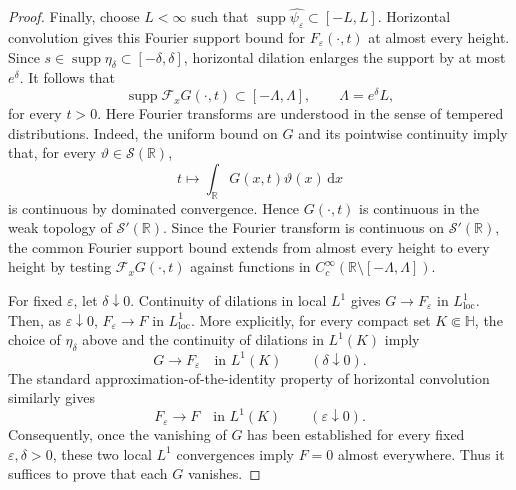 \documentclass[12pt,a4paper]{article}
\theoremstyle{remark}
\newcommand{\dd}{\,\mathrm d}
\begin{document}
\begin{proof}
Finally, choose $L<\infty$ such that
$\operatorname{supp}\widehat{\psi_\varepsilon}\subset[-L,L]$.
Horizontal convolution gives this Fourier support bound for
$F_\varepsilon(\cdot,t)$ at almost every height.
Since $s\in\operatorname{supp}\eta_\delta\subset[-\delta,\delta]$,
horizontal dilation enlarges the support by at most $e^\delta$.
It follows that
\[
\operatorname{supp}\mathcal F_xG(\cdot,t)
\subset[-\Lambda,\Lambda],
\qquad \Lambda=e^\delta L,
\]
for every $t>0$. Here Fourier transforms are understood in
the sense of tempered distributions. Indeed, the uniform bound on $G$ and its pointwise continuity
imply that, for every $\vartheta\in\mathcal S(\mathbb R)$,
\[
t\longmapsto
\int_{\mathbb R}G(x,t)\vartheta(x)\dd x
\]
is continuous by dominated convergence. Hence
$G(\cdot,t)$ is continuous in the weak topology of
$\mathcal S'(\mathbb R)$. Since the Fourier transform is continuous
on $\mathcal S'(\mathbb R)$, the common Fourier support bound
extends from almost every height to every height by testing
$\mathcal F_xG(\cdot,t)$ against functions in
$C_c^\infty(\mathbb R\setminus[-\Lambda,\Lambda])$.

For fixed $\varepsilon$, let $\delta\downarrow0$. Continuity of dilations in local $L^1$ gives
$G\to F_\varepsilon$ in $L^1_{\mathrm{loc}}$. Then, as $\varepsilon\downarrow0$,
$F_\varepsilon\to F$ in $L^1_{\mathrm{loc}}$.
More explicitly, for every compact set $K\Subset\mathbb H$, the choice of
$\eta_\delta$ above and the continuity of dilations in $L^1(K)$ imply
\[
G\longrightarrow F_\varepsilon\quad\text{in }L^1(K)\qquad(\delta\downarrow0).
\]
The standard approximation-of-the-identity property of horizontal convolution
similarly gives
\[
F_\varepsilon\longrightarrow F\quad\text{in }L^1(K)\qquad(\varepsilon\downarrow0).
\]
Consequently, once the vanishing of $G$ has been established for every fixed
$\varepsilon,\delta>0$, these two local $L^1$ convergences imply $F=0$ almost everywhere.
Thus it suffices to prove that each $G$ vanishes.


\end{proof}
\end{document}

